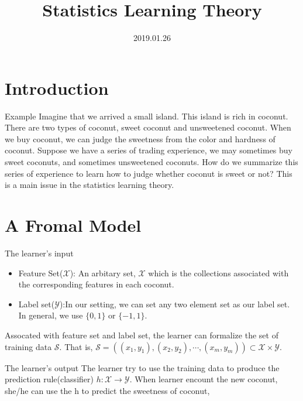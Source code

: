 \documentclass{beamer}
\title[Introduction]{Statistics Learning Theory}
\author{}
\institute{}
\date{2019.01.26}
\begin{document}
\begin{frame}
  \titlepage
\end{frame}


\section{Introduction}

\begin{frame}{Example}
	Imagine that we arrived a small island. This island is rich in coconut. There are two types of coconut, sweet coconut and unsweetened coconut. When we buy coconut, we can judge the sweetness from the color and hardness of coconut. Suppose we have a series of trading experience, we may sometimes buy sweet coconuts, and sometimes unsweetened coconuts. How do we summarize this series of experience to learn how to judge whether coconut is sweet or not? This is a main issue in the statistics learning theory. 

\end{frame}

\section{A Fromal Model}

\begin{frame}{The learner's input}
	\begin{itemize}
		\item Feature Set($\mathcal{X}$): An arbitary set, $\mathcal{X}$ which is the collections associated with the corresponding features in each coconut.
		\item Label set($\mathcal{Y}$):In our setting, we can set any two element set as our label set. In general, we use $\{0,1\}$ or $\{-1,1\}$. 
	\end{itemize}
	Assocated with feature set and label set, the learner can formalize the set of training data $\mathcal{S}$. That is, $\mathcal{S} = ( (x_1,y_1),(x_2,y_2), \cdots , (x_m,y_m) ) \subset \mathcal{X} \times \mathcal{Y}$. 
\end{frame}

\begin{frame}{The learner's output}
	The learner try to use the training data to produce the prediction rule(classifier) $h: \mathcal{X} \rightarrow \mathcal{Y}$. When learner encount the new coconut, she/he can use the h to predict the sweetness of coconut,
\end{frame}
\end{document}

